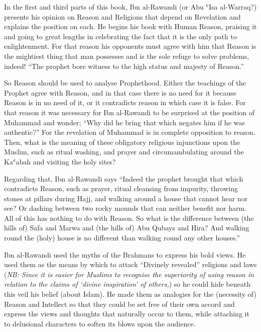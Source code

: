 \documentclass[12pt]{memoir}
\def\`{ʿ} %
\def\–{-\hskip0pt}
\newcommand{\NB}[1]{\emph{\small NB: #1}}
\begin{document}

In the first and third parts of this book, Ibn al\–Rawandi
(or Abu \`Isa al\–Warraq?) presents his opinion
on Reason and Religions that depend on Revelation
and explains the position on each.
He begins his book with Human Reason,
praising it and going to great lengths in celebrating the fact that it is the
only path to enlightenment. For that reason his opponents must agree with him
that Reason is the mightiest thing that man possesses and is the sole refuge to
solve problems, indeed! “The prophet bore witness to the high status and
majesty of Reason.”\footnotemark


So Reason should be used to analyse Prophethood. Either the teachings of the
Prophet agree with Reason, and in that case there is no need for it because
Reason is in no need of it, or it contradicts reason in which case it is false.
For that reason it was necessary for Ibn al\–Rawandi to be surprised
at the position of Muhammad and wonder;
“Why did he bring that which negates him
if he was authentic?”\footnotemark{}\@
For the revelation of Muhammad is in complete opposition to reason.
Then, what is the meaning of these obligatory religious
injunctions upon the Muslim, such as ritual washing, and prayer and
circumambulating around the Ka\`abah and visiting the holy sites?


Regarding that, Ibn al\–Rawandi says “Indeed the prophet brought that which
contradicts Reason, such as prayer, ritual cleansing from impurity, throwing
stones at pillars during Hajj, and walking around a house that cannot hear nor
see? Or dashing between two rocky mounds that can neither benefit nor harm. All
of this has nothing to do with Reason. So what is the difference between (the
hills of) Safa and Marwa and (the hills of) Abu Qubays and Hira? And walking
round the (holy) house is no different than walking round any other
houses.”\footnotemark


Ibn al\–Rawandi used the myths of the Brahmans to express his bold views.
He used them as the means by which to attack
“Divinely revealed” religions and laws
(\NB{Since it is easier for Muslims to recognise the superiority of using
reason in relation to the claims of ‘divine inspiration’ of others,})
so he could hide beneath this veil his belief (about Islam).
He made them as
analogies for the (necessity of) Reason and Intellect so that they could be set
free of their own accord and express the views and thoughts that naturally
occur to them, while attaching it to delusional characters to soften its blows
upon the audience.
\end{document}
